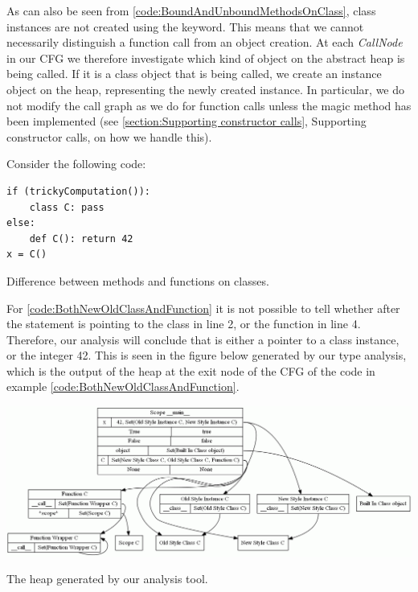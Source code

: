 As can also be seen from \autoref{code:BoundAndUnboundMethodsOnClass}, class instances are not created using the  keyword. This means that we cannot necessarily distinguish a function call from an object creation. At each \textit{CallNode} in our CFG we therefore investigate which kind of object on the abstract heap is being called. If it is a class object that is being called, we create an instance object on the heap, representing the newly created instance. In particular, we do not modify the call graph as we do for function calls unless the magic method  has been implemented (see \autoref{section:Supporting constructor calls}, Supporting constructor calls, on how we handle this).

Consider the following code:

\begin{listing}[H]
	\begin{verbatim}
if (trickyComputation()):
	class C: pass
else:
	def C(): return 42
x = C()
	\end{verbatim}
	\caption{Difference between methods and functions on classes.}
	\label{code:BothNewOldClassAndFunction}
\end{listing}

For \autoref{code:BothNewOldClassAndFunction} it is not possible to tell whether  after the  statement is pointing to the class in line 2, or the function in line 4. Therefore, our analysis will conclude that  is either a pointer to a class instance, or the integer 42. This is seen in the figure below generated by our type analysis, which is the output of the heap at the exit node of the CFG of the code in example \ref{code:BothNewOldClassAndFunction}.

\begin{listing}[H]
	\begin{center}
		\includegraphics[width=1\textwidth]{images/BothNewOldClassAndFunction.png}
	\end{center}
	\vspace{-10pt}
	\caption{The heap generated by our analysis tool.}
	\label{fig:BothNewOldClassAndFunction}
\end{listing}


